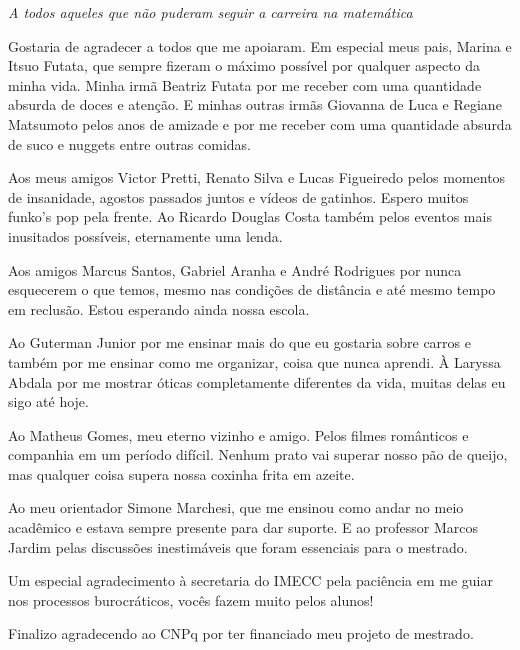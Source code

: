 \documentclass[
	oldfontcommands,
	sumario=abnt-6027-2012,
	12pt,			%
	openright,		%
	oneside,		%
	a4paper,		%
	english,		%
	brazil			%
	]{imecc-unicamp}
\begin{document}

\begin{dedicatoria}
   \vspace*{\fill}
   \centering
   \noindent
   \textit{
A todos aqueles que não puderam seguir a carreira na matemática
   }
   \vspace*{\fill}
\end{dedicatoria}
\begin{agradecimentos}
Gostaria de agradecer a todos que me apoiaram. Em especial meus pais, Marina e Itsuo Futata, que sempre fizeram o máximo possível por qualquer aspecto da minha vida. Minha irmã Beatriz Futata por me receber com uma quantidade absurda de doces e atenção. E minhas outras irmãs Giovanna de Luca e Regiane Matsumoto pelos anos de amizade e por me receber com uma quantidade absurda de suco e nuggets entre outras comidas.

Aos meus amigos Victor Pretti, Renato Silva e Lucas Figueiredo pelos momentos de insanidade, agostos passados juntos e vídeos de gatinhos. Espero muitos funko's pop pela frente. Ao Ricardo Douglas Costa também pelos eventos mais inusitados possíveis, eternamente uma lenda.

Aos amigos Marcus Santos, Gabriel Aranha e André Rodrigues por nunca esquecerem o que temos, mesmo nas condições de distância e até mesmo tempo em reclusão. Estou esperando ainda nossa escola.

Ao Guterman Junior por me ensinar mais do que eu gostaria sobre carros e também por me ensinar como me organizar, coisa que nunca aprendi. À Laryssa Abdala por me mostrar óticas completamente diferentes da vida, muitas delas eu sigo até hoje.

Ao Matheus Gomes, meu eterno vizinho e amigo. Pelos filmes românticos e companhia em um período difícil. Nenhum prato vai superar nosso pão de queijo, mas qualquer coisa supera nossa coxinha frita em azeite. 

Ao meu orientador Simone Marchesi, que me ensinou como andar no meio acadêmico e estava sempre presente para dar suporte. E ao professor Marcos Jardim pelas discussões inestimáveis que foram essenciais para o mestrado.

Um especial agradecimento à secretaria do IMECC pela paciência em me guiar nos processos burocráticos, vocês fazem muito pelos alunos!

Finalizo agradecendo ao CNPq por ter financiado meu projeto de mestrado.
\end{agradecimentos}
\end{document}

